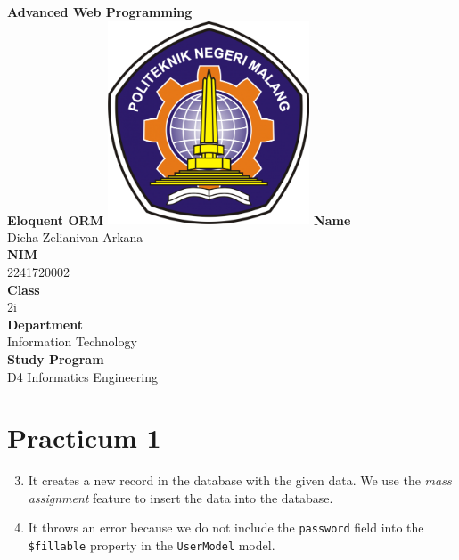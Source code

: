 \documentclass[12pt,titlepage]{article}
\newcommand{\vSubject}{Advanced Web Programming}
\newcommand{\vSubtitle}{Eloquent ORM}
\newcommand{\vName}{Dicha Zelianivan Arkana}
\newcommand{\vNIM}{2241720002}
\newcommand{\vClass}{2i}
\newcommand{\vDepartment}{Information Technology}
\newcommand{\vStudyProgram}{D4 Informatics Engineering}
\begin{document}
\begin{titlepage}
    \centering
    \vfill
    {\bfseries\LARGE
        \vSubject\\
        \vskip0.25cm
        \vSubtitle
    }
    \vfill
    \includegraphics[width=6cm]{images/polinema-logo.png}
    \vfill
    {
        \textbf{Name}\\
        \vName\\
        \vskip0.5cm
        \textbf{NIM}\\
        \vNIM\\
        \vskip0.5cm
        \textbf{Class}\\
        \vClass\\
        \vskip0.5cm
        \textbf{Department}\\
        \vDepartment\\
        \vskip0.5cm
        \textbf{Study Program}\\
        \vStudyProgram
    }
\end{titlepage}

\section{Practicum 1}
\begin{enumerate}
    \setcounter{enumi}{2}
    \item {
        It creates a new record in the database with the given data. We use the \textit{mass assignment} feature to insert the data into the database.
    }
    \setcounter{enumi}{5}
    \item {
        It throws an error because we do not include the \texttt{password} field into the \texttt{\$fillable} property in the \texttt{UserModel} model.
    }
\end{enumerate}
\end{document}
